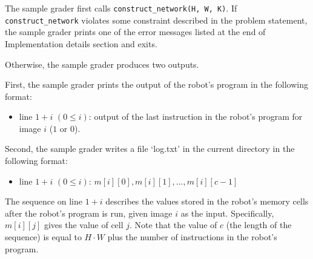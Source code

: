 The sample grader first calls \texttt{construct\_network(H, W, K)}.
If \texttt{construct\_network} violates some constraint described in the problem statement, the sample grader prints one of the error messages listed at the end of Implementation details section and exits.


Otherwise, the sample grader produces two outputs.

First, the sample grader prints the output of the robot's program in the following format:
\begin{itemize}
\item line $1+i$ $(0 \leq i)$: output of the last instruction in the robot's program for image $i$ ($1$ or $0$).
\end{itemize}

Second, the sample grader writes a file `log.txt' in the current directory in the following format:
\begin{itemize}
\item line $1+i$ $(0 \leq i)$: $m[i][0], m[i][1], \ldots, m[i][c-1]$
\end{itemize}

The sequence on line $1+i$ describes the values stored in the robot's memory cells after the robot's program is run, given image $i$ as the input.
Specifically, $m[i][j]$ gives the value of cell $j$.
Note that the value of $c$ (the length of the sequence) is equal to $H \cdot W$ plus the number of instructions in the robot's program.
